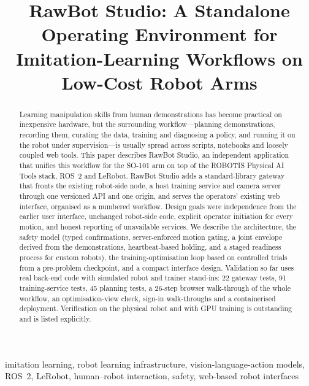 \documentclass[conference]{IEEEtran}
\begin{document}
\title{RawBot Studio: A Standalone Operating Environment for\\
Imitation-Learning Workflows on Low-Cost Robot Arms}

\author{
}

\maketitle

\begin{abstract}
Learning manipulation skills from human demonstrations has become practical on inexpensive
hardware, but the surrounding workflow---planning demonstrations, recording them, curating the
data, training and diagnosing a policy, and running it on the robot under supervision---is
usually spread across scripts, notebooks and loosely coupled web tools. This paper describes
RawBot Studio, an independent application that unifies this workflow for the SO-101 arm on top of the
ROBOTIS Physical AI Tools stack, ROS~2 and LeRobot. RawBot Studio adds a standard-library gateway
that fronts the existing robot-side node, a host training service and camera server through
one versioned API and one origin, and serves the operators' existing web interface, organised as
a numbered workflow.
Design goals were independence from the earlier user interface, unchanged robot-side code,
explicit operator initiation for every motion, and honest reporting of unavailable services.
We describe the architecture, the safety model (typed confirmations, server-enforced motion
gating, a joint envelope derived from the demonstrations, heartbeat-based holding, and a staged
readiness process for custom robots), the training-optimisation loop based on controlled trials
from a pre-problem checkpoint, and a compact interface design. Validation so far uses
real back-end code with simulated robot and trainer stand-ins: 22 gateway tests, 91
training-service tests, 45 planning tests, a 26-step browser walk-through of the whole
workflow, an optimisation-view check, sign-in walk-throughs and a containerised deployment. Verification on the physical robot and
with GPU training is outstanding and is listed explicitly.
\end{abstract}

\begin{IEEEkeywords}
imitation learning, robot learning infrastructure, vision-language-action models, ROS~2,
LeRobot, human--robot interaction, safety, web-based robot interfaces
\end{IEEEkeywords}
\end{document}
